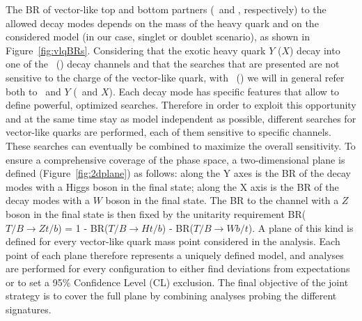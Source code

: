
The BR of vector-like top and bottom partners 
(\T\ and \B, respectively) to the allowed decay modes depends
on the mass of the heavy quark and on the considered model (in our case, singlet or doublet
scenario), as shown in Figure~\ref{fig:vlqBRs}.
Considering that the exotic heavy quark $Y$ ($X$)
decay into one of the \T\ (\B) decay channels
and that the searches that are presented are not
sensitive to the charge of the vector-like quark,
with \T\ (\B) we will in general refer both to
\T\ and $Y$ (\B\ and $X$). 
Each decay mode has specific features that allow to define powerful, optimized searches.
Therefore in order to exploit this opportunity and at the same time stay as model independent
as possible, different searches for vector-like quarks 
are performed, each of them sensitive to specific channels.
These searches can eventually be combined to maximize 
the overall sensitivity.
To ensure a comprehensive coverage of the phase space, a two-dimensional plane is defined 
(Figure~\ref{fig:2dplane}) as follows:
along the Y axes is the BR of the decay 
modes with a Higgs boson in the final state; along the X axis is the BR 
of the decay modes with a $W$ boson in the final state.
The BR to the channel with a $Z$ boson in the final state is then fixed by the 
unitarity requirement BR($T/B\to  Zt/b$) = 1 - BR($T/B\to Ht/b$) - BR($T/B\to Wb/t$).
A plane of this kind is defined for every vector-like quark mass point considered 
in the analysis. Each point of each plane therefore represents a 
uniquely defined model, and analyses are performed for every configuration
to either find deviations from expectations or to set a 95\% Confidence Level (CL) exclusion.
The final objective of the joint strategy is to cover the full plane by combining
analyses probing the different signatures.

